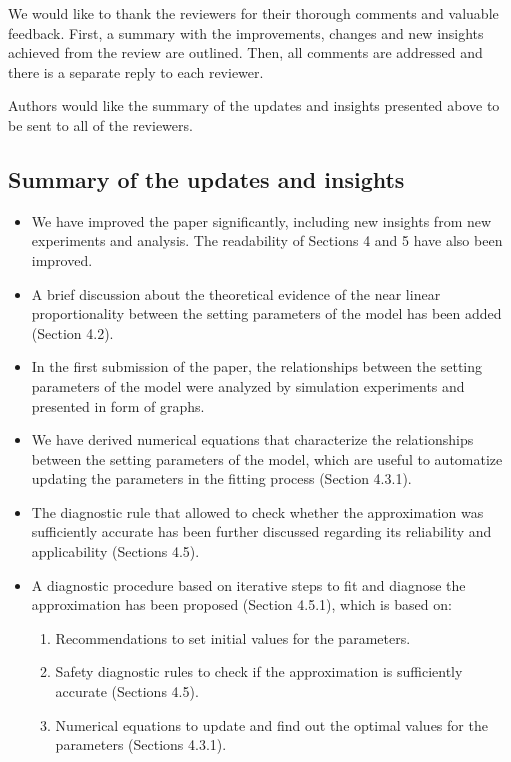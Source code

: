 \documentclass[11pt]{report}
\begin{document}
We would like to thank the reviewers for their thorough comments and valuable feedback. First, a summary with the improvements, changes and new insights achieved from the review are outlined. Then, all comments are addressed and there is a separate reply to each reviewer.

Authors would like the summary of the updates and insights presented above to be sent to all of the reviewers.

\noindent \hdashrule{12.5cm}{0.2pt}{2mm 1pt}

\subsection*{Summary of the updates and insights}

\begin{itemize}

\item We have improved the paper significantly, including new insights from new experiments and analysis. The readability of Sections 4 and 5 have also been improved.

\item A brief discussion about the theoretical evidence of the near linear proportionality between the setting parameters of the model has been added (Section 4.2). 

\item In the first submission of the paper, the relationships between the setting parameters of the model were analyzed by simulation experiments and presented in form of graphs. 

\item We have derived numerical equations that characterize the relationships between the setting parameters of the model, which are useful to automatize updating the parameters in the fitting process (Section 4.3.1). 

\item The diagnostic rule that allowed to check whether the approximation was sufficiently accurate has been further discussed regarding its reliability and applicability (Sections 4.5).

\item A diagnostic procedure based on iterative steps to fit and diagnose the approximation has been proposed (Section 4.5.1), which is based on:

\begin{enumerate}
\item Recommendations to set initial values for the parameters.
\item Safety diagnostic rules to check if the approximation is sufficiently accurate (Sections 4.5).
\item Numerical equations to update and find out the optimal values for the parameters (Sections 4.3.1).
\end{enumerate}


\end{itemize}
\end{document}
